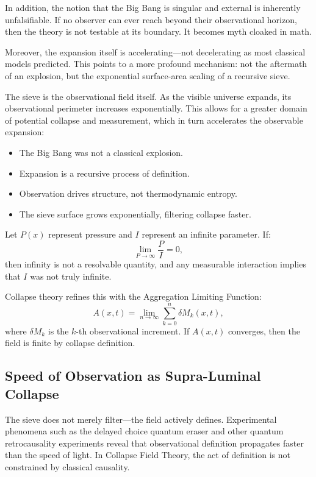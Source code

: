 In addition, the notion that the Big Bang is singular and external is inherently unfalsifiable. If no observer can ever reach beyond their observational horizon, then the theory is not testable at its boundary. It becomes myth cloaked in math.

Moreover, the expansion itself is accelerating—not decelerating as most classical models predicted. This points to a more profound mechanism: not the aftermath of an explosion, but the exponential surface-area scaling of a recursive sieve.

The sieve is the observational field itself. As the visible universe expands, its observational perimeter increases exponentially. This allows for a greater domain of potential collapse and measurement, which in turn accelerates the observable expansion:

\begin{itemize}
  \item The Big Bang was not a classical explosion.
  \item Expansion is a recursive process of definition.
  \item Observation drives structure, not thermodynamic entropy.
  \item The sieve surface grows exponentially, filtering collapse faster.
\end{itemize}

Let $P(x)$ represent pressure and $I$ represent an infinite parameter. If:
\[
\lim_{P \to \infty} \frac{P}{I} = 0,
\]
then infinity is not a resolvable quantity, and any measurable interaction implies that $I$ was not truly infinite.

Collapse theory refines this with the Aggregation Limiting Function:
\begin{equation}
A(x,t) = \lim_{n \to \infty} \sum_{k=0}^{n} \delta M_k(x,t),
\end{equation}
where $\delta M_k$ is the $k$-th observational increment. If $A(x,t)$ converges, then the field is finite by collapse definition.

\subsection*{Speed of Observation as Supra-Luminal Collapse}

The sieve does not merely filter—the field actively defines. Experimental phenomena such as the delayed choice quantum eraser\cite{wheeler1984delayed} and other quantum retrocausality experiments\cite{kim2000delayed} reveal that observational definition propagates faster than the speed of light. In Collapse Field Theory, the act of definition is not constrained by classical causality.

